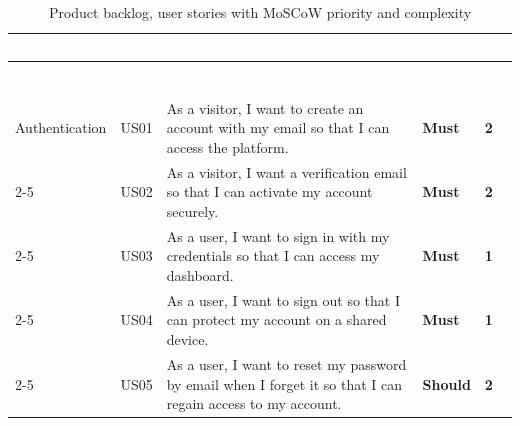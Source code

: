 \setlength{\extrarowheight}{3pt}
\begin{longtable}{|>{\centering\arraybackslash\small}p{2.2cm}|>{\centering\arraybackslash\small}p{0.9cm}|>{\small}p{7.4cm}|>{\centering\arraybackslash\small}p{1.3cm}|>{\centering\arraybackslash\small}p{0.6cm}|}
  \caption{Product backlog, user stories with MoSCoW priority and complexity}\label{tab:backlog}\\
  \hline
  \rowcolor{tableHeader}
  \textcolor{white}{\textbf{Feature}} & \textcolor{white}{\textbf{ID}} &
  \textcolor{white}{\textbf{User Story}} & \textcolor{white}{\textbf{P}} &
  \textcolor{white}{\textbf{Cx}} \\ \hline
  \endfirsthead
  \hline
  \rowcolor{tableHeader}
  \textcolor{white}{\textbf{Feature}} & \textcolor{white}{\textbf{ID}} &
  \textcolor{white}{\textbf{User Story}} & \textcolor{white}{\textbf{P}} &
  \textcolor{white}{\textbf{Cx}} \\ \hline
  \endhead
  \hline \multicolumn{5}{r|}{\small\textit{Continued on next page}}\\
  \endfoot
  \hline
  \endlastfoot

  \cellcolor{featAuth}\makecell[c]{\textbf{F1}\\\small Authentication}
  & US01 & As a visitor, I want to create an account with my email so that I can access the platform. & \cellcolor{moscowMust}\textbf{Must} & \cellcolor{complexMed}\textbf{2} \\\cline{2-5}
  \cellcolor{featAuth} & US02 & As a visitor, I want a verification email so that I can activate my account securely. & \cellcolor{moscowMust}\textbf{Must} & \cellcolor{complexMed}\textbf{2} \\\cline{2-5}
  \cellcolor{featAuth} & US03 & As a user, I want to sign in with my credentials so that I can access my dashboard. & \cellcolor{moscowMust}\textbf{Must} & \cellcolor{complexLow}\textbf{1} \\\cline{2-5}
  \cellcolor{featAuth} & US04 & As a user, I want to sign out so that I can protect my account on a shared device. & \cellcolor{moscowMust}\textbf{Must} & \cellcolor{complexLow}\textbf{1} \\\cline{2-5}
  \cellcolor{featAuth} & US05 & As a user, I want to reset my password by email when I forget it so that I can regain access to my account. & \cellcolor{moscowShould}\textbf{Should} & \cellcolor{complexMed}\textbf{2} \\\hline


\end{longtable}
